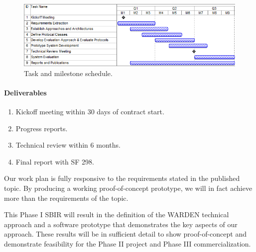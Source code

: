 \documentclass{sbir}
\begin{document}
\begin{figure}[h]
 \centerline{\includegraphics[width=5in]{./images/AF13-AT08_Gantt_Chart.png}}
 \caption{Task and milestone schedule.}
 \label{Gantt}
\end{figure}

\paragraph{Deliverables}
\begin{enumerate}[label=\alph*.] 
\vspace{-0.1in}
\item Kickoff meeting within 30 days of contract start.
\item Progress reports.
\item Technical review within 6 months.
\item Final report with SF 298.
\end{enumerate}

Our work plan is fully responsive to the requirements stated in the published topic. By producing a working proof-of-concept prototype, we will in fact achieve more than the requirements of the topic.

\newpage
{}

{This Phase I SBIR will result in the definition of the WARDEN technical approach and a software prototype that demonstrates the key aspects of our approach. These results will be in sufficient detail to show proof-of-concept and demonstrate feasibility for the Phase II project and Phase III commercialization.}
\end{document}
